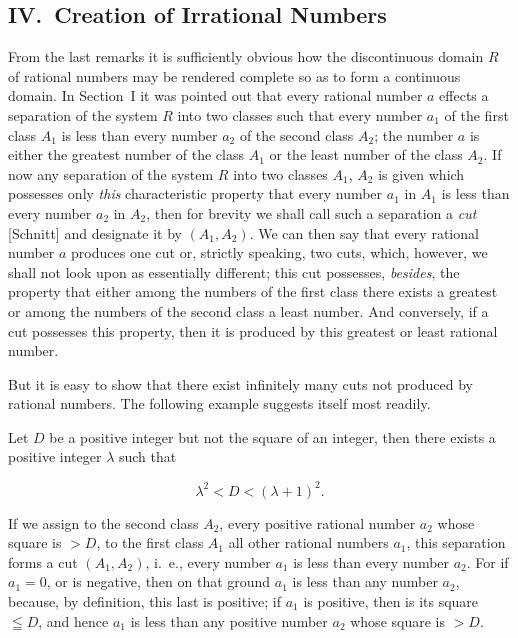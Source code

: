 \documentclass[twoside,openright]{article}
\begin{document}
\subsection*{IV.\ Creation of Irrational Numbers}
\label{EISIV}

From the last remarks it is sufficiently obvious how the discontinuous
domain $R$ of rational numbers may be rendered complete so as to form
a continuous domain. In Section~I it was pointed out that every
rational number $a$ effects a separation of the system $R$ into two
classes such that every number $a_1$ of the first class $A_1$ is less
than every number $a_2$ of the second class $A_2$; the number $a$ is
either the greatest number of the class $A_1$ or the least number of
the class $A_2$. If now any separation of the system $R$ into two
classes $A_1$, $A_2$ is given which possesses only \textit{this}
characteristic property that every number $a_1$ in $A_1$ is less than
every number $a_2$ in $A_2$, then for brevity we shall call such a
separation a \textit{cut} [Schnitt] and designate it by $(A_1, A_2)$.
We can then say that every rational number $a$ produces one cut or,
strictly speaking, two cuts, which, however, we shall not look upon as
essentially different; this cut possesses, \textit{besides}, the
property that either among the numbers of the first class there exists
a greatest or among the numbers of the second class a least
number. And conversely, if a cut possesses this property, then it is
produced by this greatest or least rational number.

But it is easy to show that there exist infinitely many cuts not
produced by rational numbers. The following example suggests itself
most readily.

Let $D$ be a positive integer\label{DposNotSq} but not the square of
an integer, then there exists a positive integer $\lambda$ such that

\[
\lambda^2 < D <(\lambda + 1)^2.
\]

If we assign to the second class $A_2$, every positive rational number
$a_2$ whose square is $> D$, to the first class $A_1$ all other
rational numbers $a_1$, this separation forms a cut $(A_1, A_2)$,
i.~e., every number $a_1$ is less than every number $a_2$. For if
$a_1 = 0$, or is negative, then on that ground $a_1$ is less than any
number $a_2$, because, by definition, this last is positive; if $a_1$
is positive, then is its square $\leqq D$, and hence $a_1$ is less
than any positive number $a_2$ whose square is $> D$.
\end{document}

